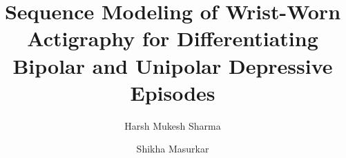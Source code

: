 \documentclass[runningheads]{llncs}
\begin{document}
\raggedbottom
\pagestyle{headings}
\mainmatter
\def\ECCV16SubNumber{***}

\title{Sequence Modeling of Wrist-Worn Actigraphy for Differentiating Bipolar and Unipolar Depressive Episodes}

\author{Harsh Mukesh Sharma \and Shikha Masurkar}

\maketitle

\begin{abstract}

\end{abstract}










\end{document}
